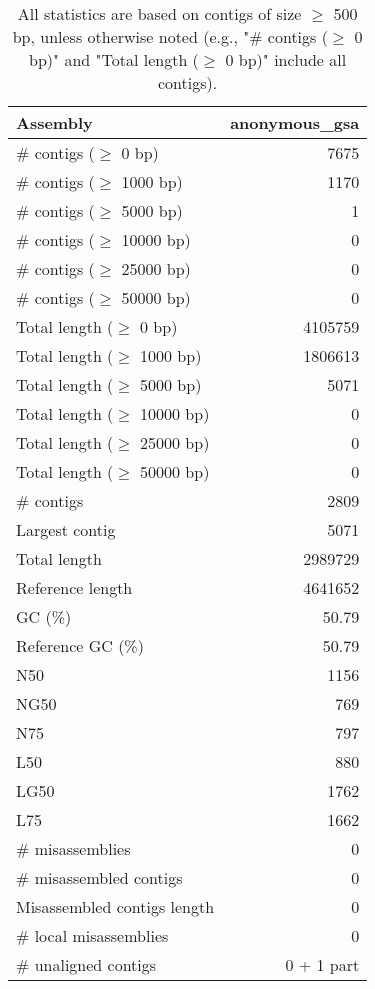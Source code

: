 \documentclass[12pt,a4paper]{article}
\begin{document}
\begin{table}[ht]
\begin{center}
\caption{All statistics are based on contigs of size $\geq$ 500 bp, unless otherwise noted (e.g., "\# contigs ($\geq$ 0 bp)" and "Total length ($\geq$ 0 bp)" include all contigs).}
\begin{tabular}{|l*{1}{|r}|}
\hline
Assembly & anonymous\_gsa \\ \hline
\# contigs ($\geq$ 0 bp) & 7675 \\ \hline
\# contigs ($\geq$ 1000 bp) & 1170 \\ \hline
\# contigs ($\geq$ 5000 bp) & 1 \\ \hline
\# contigs ($\geq$ 10000 bp) & 0 \\ \hline
\# contigs ($\geq$ 25000 bp) & 0 \\ \hline
\# contigs ($\geq$ 50000 bp) & 0 \\ \hline
Total length ($\geq$ 0 bp) & 4105759 \\ \hline
Total length ($\geq$ 1000 bp) & 1806613 \\ \hline
Total length ($\geq$ 5000 bp) & 5071 \\ \hline
Total length ($\geq$ 10000 bp) & 0 \\ \hline
Total length ($\geq$ 25000 bp) & 0 \\ \hline
Total length ($\geq$ 50000 bp) & 0 \\ \hline
\# contigs & 2809 \\ \hline
Largest contig & 5071 \\ \hline
Total length & 2989729 \\ \hline
Reference length & 4641652 \\ \hline
GC (\%) & 50.79 \\ \hline
Reference GC (\%) & 50.79 \\ \hline
N50 & 1156 \\ \hline
NG50 & 769 \\ \hline
N75 & 797 \\ \hline
L50 & 880 \\ \hline
LG50 & 1762 \\ \hline
L75 & 1662 \\ \hline
\# misassemblies & 0 \\ \hline
\# misassembled contigs & 0 \\ \hline
Misassembled contigs length & 0 \\ \hline
\# local misassemblies & 0 \\ \hline
\# unaligned contigs & 0 + 1 part \\ \hline

\end{tabular}
\end{center}
\end{table}
\end{document}
